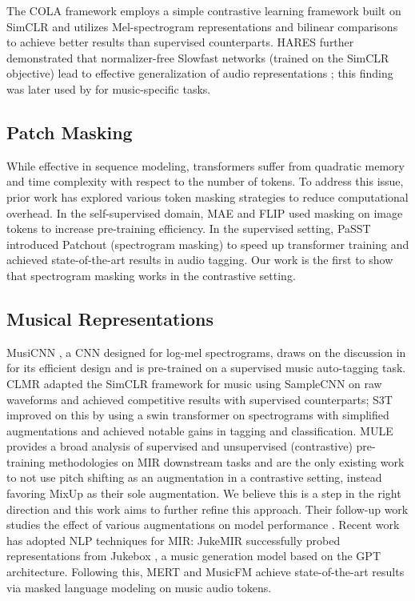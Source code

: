 The COLA framework \cite{COLA} employs a simple contrastive learning framework built on SimCLR and utilizes Mel-spectrogram representations and bilinear comparisons to achieve better results than supervised counterparts. HARES \cite{HARES} further demonstrated that normalizer-free Slowfast networks (trained on the SimCLR objective) lead to effective generalization of audio representations \cite{slowfast, nfnets}; this finding was later used by \cite{MULE} for music-specific tasks.

\subsection{Patch Masking}
While effective in sequence modeling, transformers \cite{transformer} suffer from quadratic memory and time complexity with respect to the number of tokens. To address this issue, prior work has explored various token masking strategies to reduce computational overhead. In the self-supervised domain, MAE and FLIP \cite{MAE, FLIP} used masking on image tokens to increase pre-training efficiency. In the supervised setting, PaSST \cite{patchout} introduced Patchout (spectrogram masking) to speed up transformer training and achieved state-of-the-art results in audio tagging. Our work is the first to show that spectrogram masking works in the contrastive setting. 

\subsection{Musical Representations}

MusiCNN \cite{MusiCNN}, a CNN designed for log-mel spectrograms, draws on the discussion in \cite{PonsCNN} for its efficient design and is pre-trained on a supervised music auto-tagging task. CLMR \cite{CLMR} adapted the SimCLR framework for music using SampleCNN \cite{SampleCNN} on raw waveforms and achieved competitive results with supervised counterparts; S3T \cite{s3t} improved on this by using a swin transformer \cite{swin} on spectrograms with simplified augmentations and achieved notable gains in tagging and classification. MULE \cite{MULE} provides a broad analysis of supervised and unsupervised (contrastive) pre-training methodologies on MIR downstream tasks and are the only existing work to not use pitch shifting as an augmentation in a contrastive setting, instead favoring MixUp \cite{MixUp} as their sole augmentation. We believe this is a step in the right direction and this work aims to further refine this approach. Their follow-up work studies the effect of various augmentations on model performance \cite{augmentation-embedding}. Recent work has adopted NLP techniques for MIR: JukeMIR \cite{JukeMIR} successfully probed representations from Jukebox \cite{Jukebox}, a music generation model based on the GPT architecture. Following this, MERT \cite{MERT} and MusicFM \cite{MusicFM} achieve state-of-the-art results via masked language modeling on music audio tokens.